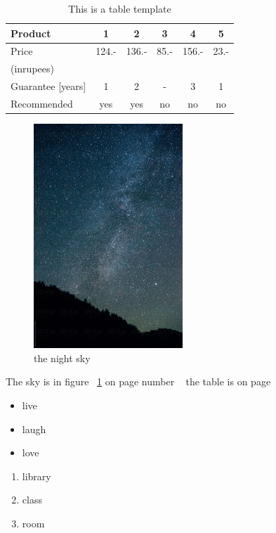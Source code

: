 \documentclass[a4paper,12pt]{article}
\begin{document}
\begin{table}[t]
\centering
\begin{tabular}{|l|c|c|c|c|c|}
\hline
Product & 1 & 2 & 3 & 4 & 5\\
\hline
Price & 124.- & 136.- & 85.- & 156.- & 23.-\\
(inrupees)& & & & & \\
\hline
Guarantee [years] & 1 & 2 & - & 3 & 1\\
\hline
Recommended & yes & yes & no & no & no\\
\hline
\end{tabular}
\caption{This is a table template}
\label{tab:table}
\end{table}
\newpage
\newpage
\begin{figure}[ht]
\centering
\includegraphics[width=0.5\textwidth]{index.jpg}
\caption{the night sky}
\label{fig:sky}
\end{figure} 
\centering
\newpage   
The sky is in figure ~\ref{fig:sky} on page number ~\pageref{fig:sky}
the table is on page ~\pageref{tab:table}
\begin{itemize}
\item live
\item laugh
\item love
\end{itemize}
\begin{enumerate}
\item library
\item class
\item room
\end{enumerate}
\end{document}
